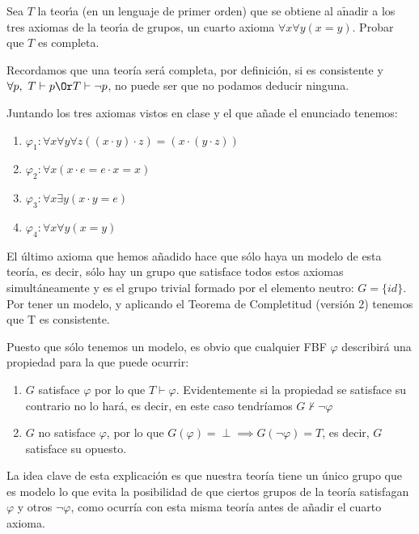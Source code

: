 \begin{problem} 
Sea $T$ la teor\'{\i}a (en un lenguaje de primer orden) 
que se obtiene al a$\operatorname{\tilde{n}}$adir a los tres axiomas de la teor\'{\i}a de  grupos,
un cuarto axioma $\forall x\forall y (x = y)$. Probar que $T$ es completa.
\solution


Recordamos que una teoría será completa, por definición, si es consistente y $\forall p, \ T \vdash p \Or T\vdash \neg p$, no puede ser que no podamos deducir ninguna.

Juntando los tres axiomas vistos en clase y el que añade el enunciado tenemos:
\begin{enumerate}
\item $\varphi_1: \forall x\forall y\forall z ((x\cdot y)\cdot z) = (x\cdot(y\cdot z))$
\item $\varphi_2: \forall x(x\cdot e = e\cdot x = x)$
\item $\varphi_3: \forall x\exists y (x\cdot y = e)$
\item $\varphi_4: \forall x\forall y (x=y)$
\end{enumerate}

El último axioma que hemos añadido hace que sólo haya un modelo de esta teoría, es decir, sólo hay un grupo que satisface todos estos axiomas simultáneamente y es el grupo trivial formado por el elemento neutro: $G=\{id\}$. Por tener un modelo, y aplicando el Teorema de Completitud (versión 2) tenemos que T es consistente.

Puesto que sólo tenemos un modelo, es obvio que cualquier FBF $\varphi$ describirá una propiedad para la que puede ocurrir:
\begin{enumerate}
\item $G$ satisface $\varphi$ por lo que $T \vdash \varphi $. Evidentemente si la propiedad se satisface su contrario no lo hará, es decir, en este caso tendríamos $G \nvdash \neg \varphi$


\item $G$ no satisface $\varphi$, por lo que $G(\varphi) = \perp \implies G(\neg \varphi) = T$, es decir, $G$ satisface su opuesto.
\end{enumerate}

La idea clave de esta explicación es que nuestra teoría tiene un único grupo que es modelo lo que evita la posibilidad de que ciertos grupos de la teoría satisfagan $\varphi$ y otros $\neg \varphi$, como ocurría con esta misma teoría antes de añadir el cuarto axioma.


\end{problem}
